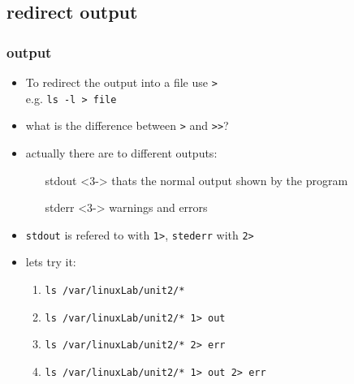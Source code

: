 \documentclass[hyperref={pdfpagelabels=false}]{beamer}
\newcommand{\code}[1]{\colorbox{lGray}{\texttt{#1}}}
\begin{document}
    \subsection{redirect output}
        \begin{frame}
			\frametitle{output}
			\begin{itemize}
                \item<1-> To redirect the output into a file use \code{\textgreater} \\
                        e.g. \code{ls -l \textgreater\ file}
                \item<2-> what is the difference between \code{\textgreater} and \code{\textgreater \textgreater}?
                \item<3-> actually there are to different outputs:
                \begin{itemize}
                    \item[stdout]<3-> thats the normal output shown by the program
                    \item[stderr]<3-> warnings and errors
                \end{itemize}
                \item<4-> \code{stdout} is refered to with \code{1\textgreater}, \code{stederr} with \code{2\textgreater}
                \item<5-> lets try it:
                \begin{enumerate}
                    \item<5-> \code{ls /var/linuxLab/unit2/*}
                    \item<6-> \code{ls /var/linuxLab/unit2/*\ 1\textgreater\ out }
                    \item<7-> \code{ls /var/linuxLab/unit2/*\ 2\textgreater\ err }
                    \item<8-> \code{ls /var/linuxLab/unit2/*\ 1\textgreater\ out\ 2\textgreater\ err}
                \end{enumerate}
            \end{itemize}
        \end{frame}
    
\end{document}
